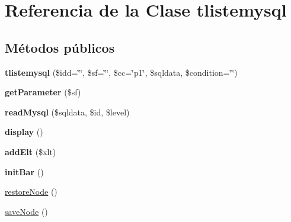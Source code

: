 \hypertarget{classtlistemysql}{\section{\-Referencia de la \-Clase tlistemysql}
\label{classtlistemysql}
}
\subsection*{\-Métodos públicos}
\begin{DoxyCompactItemize}
\item 
\hypertarget{classtlistemysql_af1a889d94a44fc0762f01f1b493a5c32}{{\bfseries tlistemysql} (\$idd=\char`\"{}\char`\"{}, \$sf=\char`\"{}\char`\"{}, \$cc=\char`\"{}p1\char`\"{}, \$sqldata, \$condition=\char`\"{}\char`\"{})}\label{classtlistemysql_af1a889d94a44fc0762f01f1b493a5c32}

\item 
\hypertarget{classtlistemysql_a084df3acfe2c7828c1a3d999249022e0}{{\bfseries get\-Parameter} (\$sf)}\label{classtlistemysql_a084df3acfe2c7828c1a3d999249022e0}

\item 
\hypertarget{classtlistemysql_ab54c0101c71218747c16cefa3cff30e3}{{\bfseries read\-Mysql} (\$sqldata, \$id, \$level)}\label{classtlistemysql_ab54c0101c71218747c16cefa3cff30e3}

\item 
\hypertarget{classtlistemysql_a7007fb0857176648aeee18c73f059867}{{\bfseries display} ()}\label{classtlistemysql_a7007fb0857176648aeee18c73f059867}

\item 
\hypertarget{classtlistemysql_a1b00bffbd371386616d7ac066fb72d96}{{\bfseries add\-Elt} (\$xlt)}\label{classtlistemysql_a1b00bffbd371386616d7ac066fb72d96}

\item 
\hypertarget{classtlistemysql_accab70872d4dec1339c56cee4d9aebf4}{{\bfseries init\-Bar} ()}\label{classtlistemysql_accab70872d4dec1339c56cee4d9aebf4}

\item 
\hyperlink{classtlistemysql_a90b5cddbe5cda56f32fee824f6d345ba}{restore\-Node} ()
\item 
\hyperlink{classtlistemysql_a43c24fd4e27b46f3ac409d1a8a16623b}{save\-Node} ()
\end{DoxyCompactItemize}
